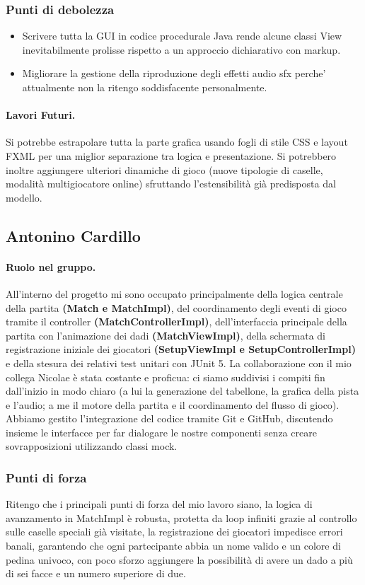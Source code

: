 \documentclass[a4paper,12pt]{report}
\begin{document}
\subsubsection{Punti di debolezza}
\begin{itemize}
    \item Scrivere tutta la GUI in codice procedurale Java rende alcune classi View inevitabilmente prolisse rispetto a un approccio dichiarativo con markup.
    \item Migliorare la gestione della riproduzione degli effetti audio sfx perche' attualmente non la ritengo soddisfacente personalmente.
\end{itemize}

\paragraph{Lavori Futuri.}Si potrebbe estrapolare tutta la parte grafica usando fogli di stile CSS e layout FXML per una miglior separazione tra logica e presentazione. Si potrebbero inoltre aggiungere ulteriori dinamiche di gioco (nuove tipologie di caselle, modalità multigiocatore online) sfruttando l'estensibilità già predisposta dal modello.

\subsection{Antonino Cardillo}
\paragraph{Ruolo nel gruppo.} All'interno del progetto mi sono occupato principalmente della logica centrale della partita \textbf{(Match e MatchImpl)}, del coordinamento degli eventi di gioco tramite il controller \textbf{(MatchControllerImpl)}, dell'interfaccia principale della partita con l'animazione dei dadi \textbf{(MatchViewImpl)}, della schermata di registrazione iniziale dei giocatori \textbf{(SetupViewImpl e SetupControllerImpl)} e della stesura dei relativi test unitari con JUnit 5. 
La collaborazione con il mio collega Nicolae è stata costante e proficua: ci siamo suddivisi i compiti fin dall'inizio in modo chiaro (a lui la generazione del tabellone, la grafica della pista e l'audio; a me il motore della partita e il coordinamento del flusso di gioco). Abbiamo gestito l'integrazione del codice tramite Git e GitHub, discutendo insieme le interfacce per far dialogare le nostre componenti senza creare sovrapposizioni utilizzando classi mock.
\subsubsection{Punti di forza}
Ritengo che i principali punti di forza del mio lavoro siano, la logica di avanzamento in MatchImpl è robusta, protetta da loop infiniti grazie al controllo sulle caselle speciali già visitate, la registrazione dei giocatori impedisce errori banali, garantendo che ogni partecipante abbia un nome valido e un colore di pedina univoco, con poco sforzo aggiungere la possibilità di avere un dado a più di sei facce e un numero superiore di due.
\end{document}
